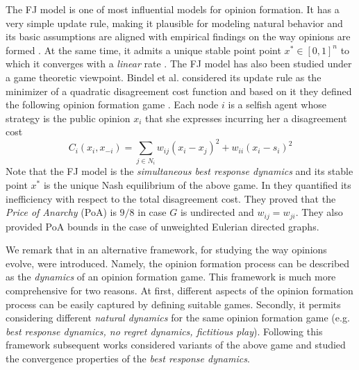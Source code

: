 The FJ model is one of most influential models for opinion formation. It has a
very simple update rule, making it plausible for modeling natural behavior and
its basic assumptions are aligned with empirical findings on the way opinions
are formed \cite{AFH05,K47}.  At the same time, it admits a unique stable point
point $x^* \in [0,1]^n$ to which it converges with a \emph{linear} rate \cite{GS14}.
The FJ model has also been studied under a game theoretic viewpoint.  Bindel et
al. considered its update rule as the minimizer of a quadratic disagreement
cost function and based on it they defined the following opinion formation game
\cite{BKO11}. Each node $i$ is a selfish agent whose strategy is the public
opinion $x_i$ that she expresses incurring her a disagreement cost
%
\begin{equation}\label{eq:BKO_cost}
  C_i(x_i,x_{-i})= \sum_{j \in N_i}w_{ij} (x_i-x_j)^2 + w_{ii}(x_i-s_i)^2
\end{equation}
%
Note that the FJ model is the \emph{simultaneous best response dynamics} and
its stable point $x^*$ is the unique Nash equilibrium of the above game.  In
\cite{BKO11} they quantified its inefficiency with respect to the total
disagreement cost. They proved that the \emph{Price of Anarchy} (PoA) is $9/8$
in case $G$ is undirected and $w_{ij}=w_{ji}$. They also provided PoA bounds in
the case of unweighted Eulerian directed graphs.


We remark that in \cite{BKO11} an alternative framework, for studying the way
opinions evolve, were introduced. Namely, the opinion formation process can be
described as the \emph{dynamics} of an opinion formation game. This framework
is much more comprehensive for two reasons. At first, different aspects of the
opinion formation process can be easily captured by defining suitable games.
Secondly, it permits considering different \emph{natural dynamics} for the same
opinion formation game (e.g. \emph{best response dynamics, no regret dynamics,
fictitious play}). Following this framework subsequent works
\cite{BGM13,BFM16,EFHS17} considered variants of the above game and studied the
convergence properties of the \emph{best response dynamics}.

